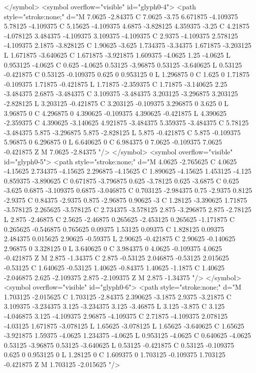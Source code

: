 </symbol>
<symbol overflow="visible" id="glyph0-4">
<path style="stroke:none;" d="M 7.0625 -2.84375 C 7.0625 -3.75 6.671875 -4.109375 5.78125 -4.109375 C 5.15625 -4.109375 4.6875 -3.828125 4.359375 -3.25 C 4.21875 -4.078125 3.484375 -4.109375 3.109375 -4.109375 C 2.9375 -4.109375 2.578125 -4.109375 2.1875 -3.828125 C 1.90625 -3.625 1.734375 -3.34375 1.671875 -3.203125 L 1.671875 -3.640625 C 1.671875 -3.921875 1.609375 -4.0625 1.25 -4.0625 L 0.953125 -4.0625 C 0.625 -4.0625 0.53125 -3.96875 0.53125 -3.640625 L 0.53125 -0.421875 C 0.53125 -0.109375 0.625 0 0.953125 0 L 1.296875 0 C 1.625 0 1.71875 -0.109375 1.71875 -0.421875 L 1.71875 -2.359375 C 1.71875 -3.140625 2.25 -3.484375 2.6875 -3.484375 C 3.109375 -3.484375 3.203125 -3.296875 3.203125 -2.828125 L 3.203125 -0.421875 C 3.203125 -0.109375 3.296875 0 3.625 0 L 3.96875 0 C 4.296875 0 4.390625 -0.109375 4.390625 -0.421875 L 4.390625 -2.359375 C 4.390625 -3.140625 4.921875 -3.484375 5.359375 -3.484375 C 5.78125 -3.484375 5.875 -3.296875 5.875 -2.828125 L 5.875 -0.421875 C 5.875 -0.109375 5.96875 0 6.296875 0 L 6.640625 0 C 6.984375 0 7.0625 -0.109375 7.0625 -0.421875 Z M 7.0625 -2.84375 "/>
</symbol>
<symbol overflow="visible" id="glyph0-5">
<path style="stroke:none;" d="M 4.0625 -2.765625 C 4.0625 -4.15625 2.734375 -4.15625 2.296875 -4.15625 C 1.890625 -4.15625 1.453125 -4.125 0.859375 -3.890625 C 0.671875 -3.796875 0.625 -3.78125 0.625 -3.6875 C 0.625 -3.625 0.6875 -3.109375 0.6875 -3.046875 C 0.703125 -2.984375 0.75 -2.9375 0.8125 -2.9375 C 0.84375 -2.9375 0.875 -2.96875 0.90625 -3 C 1.28125 -3.390625 1.71875 -3.578125 2.265625 -3.578125 C 2.734375 -3.578125 2.875 -3.296875 2.875 -2.78125 L 2.875 -2.46875 C 2.5625 -2.46875 0.265625 -2.453125 0.265625 -1.171875 C 0.265625 -0.546875 0.765625 0.09375 1.53125 0.09375 C 1.828125 0.09375 2.484375 0.015625 2.90625 -0.59375 L 2.90625 -0.421875 C 2.90625 -0.140625 2.96875 0 3.328125 0 L 3.640625 0 C 3.984375 0 4.0625 -0.109375 4.0625 -0.421875 Z M 2.875 -1.34375 C 2.875 -0.53125 2.046875 -0.53125 2.015625 -0.53125 C 1.640625 -0.53125 1.40625 -0.84375 1.40625 -1.1875 C 1.40625 -2.046875 2.625 -2.109375 2.875 -2.109375 Z M 2.875 -1.34375 "/>
</symbol>
<symbol overflow="visible" id="glyph0-6">
<path style="stroke:none;" d="M 1.703125 -2.015625 C 1.703125 -2.84375 2.390625 -3.1875 2.9375 -3.21875 C 3.109375 -3.234375 3.125 -3.234375 3.125 -3.46875 L 3.125 -3.875 C 3.125 -4.046875 3.125 -4.109375 2.96875 -4.109375 C 2.71875 -4.109375 2.078125 -4.03125 1.671875 -3.078125 L 1.65625 -3.078125 L 1.65625 -3.640625 C 1.65625 -3.921875 1.59375 -4.0625 1.234375 -4.0625 L 0.953125 -4.0625 C 0.640625 -4.0625 0.53125 -3.96875 0.53125 -3.640625 L 0.53125 -0.421875 C 0.53125 -0.109375 0.625 0 0.953125 0 L 1.28125 0 C 1.609375 0 1.703125 -0.109375 1.703125 -0.421875 Z M 1.703125 -2.015625 "/>
